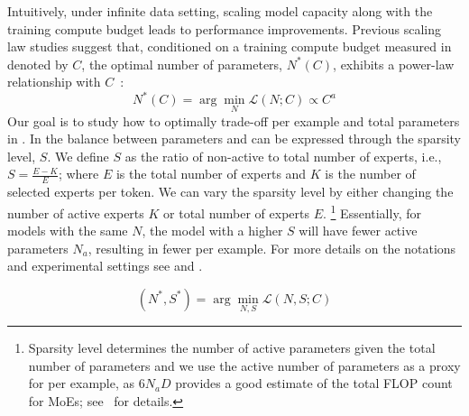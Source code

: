 Intuitively, under infinite data setting, scaling  model capacity along with the training compute budget leads to performance improvements. 
Previous scaling law studies suggest that, conditioned on a training compute budget measured in \flops denoted by \(C\), the optimal number of parameters, \(N^*(C)\), exhibits a power-law relationship with \(C\)~\citep{hoffmann2022training}:
\begin{equation}
    N^*(C) = \arg\min_{N} \mathcal{L}(N;C) \propto C^{a}
    \label{eqn:loss_n}
\end{equation}
Our goal is to study how to optimally trade-off \flops per example and total parameters in \moes.
In \moes the balance between parameters and \flops can be expressed through the sparsity level, $S$. We define $S$ as the ratio of non-active to total number of experts, i.e., $S = \frac{E - K}{E}$; where $E$ is the total number of experts and $K$ is the number of selected  experts per token. We can vary the sparsity level by either changing the number of active experts $K$ or total number of experts $E$.
\footnote{Sparsity level determines the number of active parameters given the total number of parameters and we use the active number of parameters as a proxy for \flops per example, as \( 6N_aD \) provides a good estimate of the total FLOP count for MoEs; see~ for details.}
Essentially, for models with the same \( N \), the model with a higher \( S \) will have fewer active parameters \( N_a \), resulting in fewer \flops per example. For more details on the notations and experimental settings see  and .


\begin{equation}
    (N^*, S^*) = \arg\min_{N,S} \mathcal{L}(N,S;C)
    \label{eqn:optimal_ns_given_c}
\end{equation}

